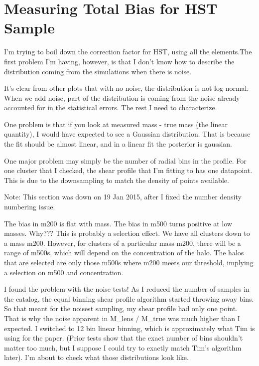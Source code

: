 \documentclass[11pt]{article}
\begin{document}
\section{Measuring Total Bias for HST Sample}

I'm trying to boil down the correction factor for HST, using all the elements.The first problem I'm having, however, is that I don't know how to describe the distribution coming from the simulations when there is noise.

It's clear from other plots that with no noise, the distribution is not log-normal. When we add noise, part of the distribution is coming from the noise already accounted for in the statistical errors. The rest I need to characterize.

One problem is that if you look at measured mass - true mass (the linear quantity), I would have expected to see a Gaussian distribution. That is because the fit should be almost linear, and in a linear fit the posterior is gaussian. 

One major problem may simply be the number of radial bins in the profile. For one cluster that I checked, the shear profile that I'm fitting to has one datapoint. This is due to the downsampling to match the density of points available. 

Note: This section was down on 19 Jan 2015, after I fixed the number density numbering issue.



The bias in m200 is flat with mass. The bias in m500 turns positive at low masses. Why??? 
This is probably a selection effect. We have all clusters down to a mass m200. However, for clusters of a particular mass m200, there will be a range of m500s, which will depend on the concentration of the halo. The halos that are selected are only those m500s where m200 meets our threshold, implying a selection on m500 and concentration.


I found the problem with the noise tests! As I reduced the number of samples in the catalog, the equal binning shear profile algorithm started throwing away bins. So that meant for the noisest sampling, my shear profile had only one point. That is why the noise apparent in M_lens / M_true was much higher than I expected. I switched to 12 bin linear binning, which is approximately what Tim is using for the paper. (Prior tests show that the exact number of bins shouldn't matter too much, but I suppose I could try to exactly match Tim's algorithm later). I'm about to check what those distributions look like.
\end{document}
